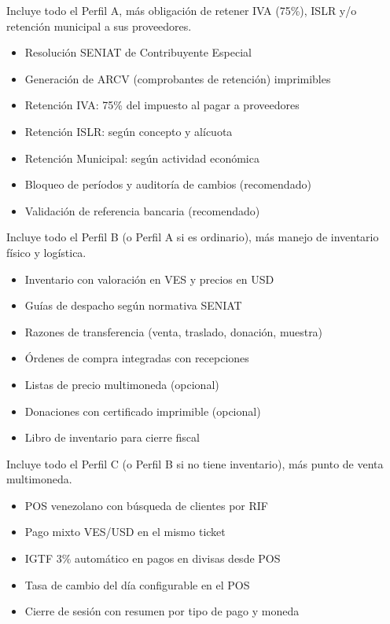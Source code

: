 \documentclass[11pt,a4paper]{article}
\begin{document}
\begin{Form}
\begin{tcolorbox}[perfilbox, title={Perfil B — Contribuyente Especial}]
Incluye todo el Perfil A, más obligación de retener IVA (75\%), ISLR y/o retención municipal a sus proveedores.
\begin{itemize}[leftmargin=1.2em, itemsep=2pt]
  \item Resolución SENIAT de Contribuyente Especial
  \item Generación de ARCV (comprobantes de retención) imprimibles
  \item Retención IVA: 75\% del impuesto al pagar a proveedores
  \item Retención ISLR: según concepto y alícuota
  \item Retención Municipal: según actividad económica
  \item Bloqueo de períodos y auditoría de cambios (recomendado)
  \item Validación de referencia bancaria (recomendado)
\end{itemize}
\end{tcolorbox}

\vspace{6pt}

\begin{tcolorbox}[perfilbox, title={Perfil C — Comercio con Inventario}]
Incluye todo el Perfil B (o Perfil A si es ordinario), más manejo de inventario físico y logística.
\begin{itemize}[leftmargin=1.2em, itemsep=2pt]
  \item Inventario con valoración en VES y precios en USD
  \item Guías de despacho según normativa SENIAT
  \item Razones de transferencia (venta, traslado, donación, muestra)
  \item Órdenes de compra integradas con recepciones
  \item Listas de precio multimoneda (opcional)
  \item Donaciones con certificado imprimible (opcional)
  \item Libro de inventario para cierre fiscal
\end{itemize}
\end{tcolorbox}

\vspace{6pt}

\begin{tcolorbox}[perfilbox, title={Perfil D — Con Punto de Venta}]
Incluye todo el Perfil C (o Perfil B si no tiene inventario), más punto de venta multimoneda.
\begin{itemize}[leftmargin=1.2em, itemsep=2pt]
  \item POS venezolano con búsqueda de clientes por RIF
  \item Pago mixto VES/USD en el mismo ticket
  \item IGTF 3\% automático en pagos en divisas desde POS
  \item Tasa de cambio del día configurable en el POS
  \item Cierre de sesión con resumen por tipo de pago y moneda
\end{itemize}
\end{tcolorbox}


\end{Form}
\end{document}
